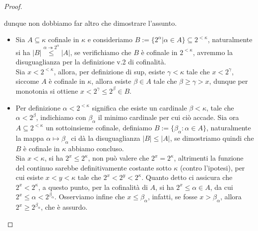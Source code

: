 \begin{proof}
\begin{itemize}
\[			\]
		dunque non dobbiamo far altro che dimostrare l'assunto.
		\begin{itemize}
			\item[$\boxed{\cof(2^{<\kappa}) \leq \cof(\kappa)}$] Sia $A \subseteq \kappa$ cofinale in $\kappa$ e consideriamo $B:=\{2^{\alpha} | \alpha \in A\}\subseteq 2^{<\kappa}$, naturalmente si ha $|B| \overset{\alpha \twoheadrightarrow 2^{\alpha}}{\leq} |A|$, se verifichiamo che $B$ \`e cofinale in $2^{<\kappa}$, avremmo la disuguaglianza per la definizione v.2 di cofinalit\`a.\\
			Sia $x < 2^{<\kappa}$, allora, per definizione di sup, esiste $\gamma < \kappa$ tale che $x < 2^\gamma$, siccome $A$ \`e cofinale in $\kappa$, allora esiste $\beta \in A$ tale che $\beta \geq \gamma > x$, dunque per monotonia si ottiene $x < 2^\gamma \leq 2^\beta \in B$.
			\item[$\boxed{\cof(\kappa) \leq \cof(2^{<\kappa})}$] Per definizione $\alpha < 2^{<\kappa}$ significa che esiste un cardinale $\beta < \kappa$, tale che $\alpha < 2^\beta$, indichiamo con $\beta_\alpha$ il minimo cardinale per cui ci\`o accade.
			Sia ora $A \subseteq 2^{<\kappa}$ un sottoinsieme cofinale, definiamo $B:=\{\beta_\alpha : \alpha \in A\}$, naturalmente la mappa $\alpha \mapsto \beta_\alpha$ ci d\`a la disuguaglianza $|B| \leq |A|$, se dimostriamo quindi che $B$ \`e cofinale in $\kappa$ abbiamo concluso.\\
			Sia $x < \kappa$, si ha $2^x \leq 2^\kappa$, non pu\`o valere che $2^x = 2^\kappa$, altrimenti la funzione del continuo sarebbe definitivamente costante sotto $\kappa$ (contro l'ipotesi), per cui esiste $x < y < \kappa$ tale che $2^x < 2^y < 2^\kappa$. Quanto detto ci assicura che $2^x < 2^\kappa$,
			a questo punto, per la cofinalit\`a di $A$, si ha $2^x \leq \alpha \in A$, da cui $2^x \leq \alpha < 2^{\beta_\alpha}$. Osserviamo infine che $x \leq \beta_\alpha$, infatti, se fosse $x > \beta_\alpha$, allora $2^x \geq 2^{\beta_\alpha}$, che \`e assurdo.
		\end{itemize}
	\end{itemize}
\end{proof}